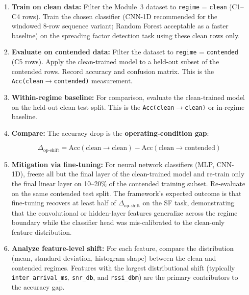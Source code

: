 \documentclass[11pt,letterpaper]{article}
\begin{document}
	\begin{enumerate}[leftmargin=2em]
		\item \textbf{Train on clean data:} Filter the Module~3 dataset to \texttt{regime} = \texttt{clean} (C1--C4 rows). Train the chosen classifier (CNN-1D recommended for the windowed 8-row sequence variant; Random Forest acceptable as a faster baseline) on the spreading factor detection task using these clean rows only.
		\item \textbf{Evaluate on contended data:} Filter the dataset to \texttt{regime} = \texttt{contended} (C5 rows). Apply the clean-trained model to a held-out subset of the contended rows. Record accuracy and confusion matrix. This is the \texttt{Acc(clean$\to$contended)} measurement.
		\item \textbf{Within-regime baseline:} For comparison, evaluate the clean-trained model on the held-out clean test split. This is the \texttt{Acc(clean$\to$clean)} or in-regime baseline.
		\item \textbf{Compare:} The accuracy drop is the \textbf{operating-condition gap}:

		\begin{equation}
			\Delta_{\text{op-shift}} = \text{Acc}(\text{clean}\!\to\!\text{clean}) - \text{Acc}(\text{clean}\!\to\!\text{contended})
			\label{eq:opshift}
		\end{equation}

		\item \textbf{Mitigation via fine-tuning:} For neural network classifiers (MLP, CNN-1D), freeze all but the final layer of the clean-trained model and re-train only the final linear layer on 10--20\% of the contended training subset. Re-evaluate on the same contended test split. The framework's expected outcome is that fine-tuning recovers at least half of $\Delta_{\text{op-shift}}$ on the SF task, demonstrating that the convolutional or hidden-layer features generalize across the regime boundary while the classifier head was mis-calibrated to the clean-only feature distribution.
		\item \textbf{Analyze feature-level shift:} For each feature, compare the distribution (mean, standard deviation, histogram shape) between the clean and contended regimes. Features with the largest distributional shift (typically \texttt{inter\_arrival\_ms}, \texttt{snr\_db}, and \texttt{rssi\_dbm}) are the primary contributors to the accuracy gap.
	\end{enumerate}
\end{document}
